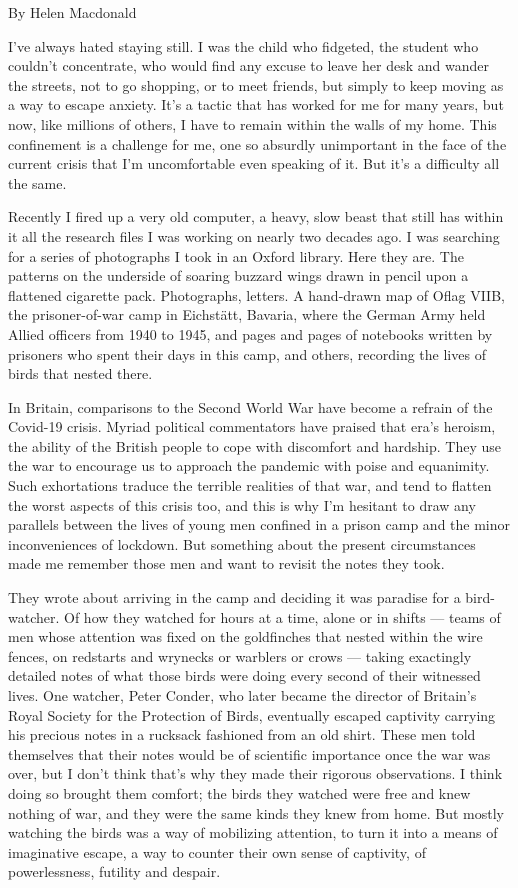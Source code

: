 By Helen Macdonald

I've always hated staying still. I was the child who fidgeted, the
student who couldn't concentrate, who would find any excuse to leave her
desk and wander the streets, not to go shopping, or to meet friends, but
simply to keep moving as a way to escape anxiety. It's a tactic that has
worked for me for many years, but now, like millions of others, I have
to remain within the walls of my home. This confinement is a challenge
for me, one so absurdly unimportant in the face of the current crisis
that I'm uncomfortable even speaking of it. But it's a difficulty all
the same.

Recently I fired up a very old computer, a heavy, slow beast that still
has within it all the research files I was working on nearly two decades
ago. I was searching for a series of photographs I took in an Oxford
library. Here they are. The patterns on the underside of soaring buzzard
wings drawn in pencil upon a flattened cigarette pack. Photographs,
letters. A hand-drawn map of Oflag VIIB, the prisoner-of-war camp in
Eichstätt, Bavaria, where the German Army held Allied officers from 1940
to 1945, and pages and pages of notebooks written by prisoners who spent
their days in this camp, and others, recording the lives of birds that
nested there.

In Britain, comparisons to the Second World War have become a refrain of
the Covid-19 crisis. Myriad political commentators have praised that
era's heroism, the ability of the British people to cope with discomfort
and hardship. They use the war to encourage us to approach the pandemic
with poise and equanimity. Such exhortations traduce the terrible
realities of that war, and tend to flatten the worst aspects of this
crisis too, and this is why I'm hesitant to draw any parallels between
the lives of young men confined in a prison camp and the minor
inconveniences of lockdown. But something about the present
circumstances made me remember those men and want to revisit the notes
they took.

They wrote about arriving in the camp and deciding it was paradise for a
bird-watcher. Of how they watched for hours at a time, alone or in
shifts --- teams of men whose attention was fixed on the goldfinches
that nested within the wire fences, on redstarts and wrynecks or
warblers or crows --- taking exactingly detailed notes of what those
birds were doing every second of their witnessed lives. One watcher,
Peter Conder, who later became the director of Britain's Royal Society
for the Protection of Birds, eventually escaped captivity carrying his
precious notes in a rucksack fashioned from an old shirt. These men told
themselves that their notes would be of scientific importance once the
war was over, but I don't think that's why they made their rigorous
observations. I think doing so brought them comfort; the birds they
watched were free and knew nothing of war, and they were the same kinds
they knew from home. But mostly watching the birds was a way of
mobilizing attention, to turn it into a means of imaginative escape, a
way to counter their own sense of captivity, of powerlessness, futility
and despair.

